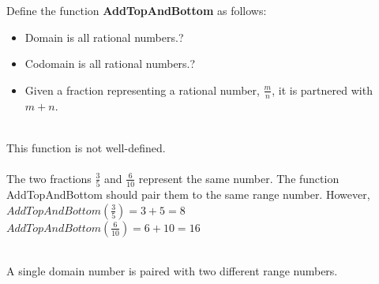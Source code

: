 \documentclass{ximera}
\begin{document}
\begin{example}
Define the function \textbf{AddTopAndBottom} as follows:
\begin{itemize}
\item Domain is all rational numbers.?\item Codomain is all rational numbers.?\item Given a fraction representing a rational number, $\frac{m}{n}$, it is partnered with $m + n$.
\end{itemize}
\quad \\

This function is not well-defined.  \\
\quad \\

The two fractions $\frac{3}{5}$ and $\frac{6}{10}$ represent the same number.  The function AddTopAndBottom should pair them to the same range number. However, \\

$AddTopAndBottom(\frac{3}{5}) = 3+5 = 8$ \\
$AddTopAndBottom(\frac{6}{10}) = 6+10 = 16$

\quad \\

A single domain number is paired with two different range numbers.

\end{example}
\end{document}
